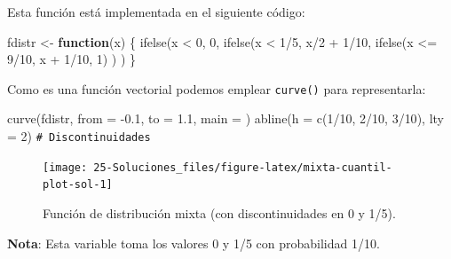 \documentclass[
  10pt,
]{book}
\newenvironment{Shaded}{\begin{snugshade}}{\end{snugshade}}
\newcommand{\AttributeTok}[1]{\textcolor[rgb]{0.77,0.63,0.00}{#1}}
\newcommand{\CommentTok}[1]{\textcolor[rgb]{0.56,0.35,0.01}{\textit{#1}}}
\newcommand{\ControlFlowTok}[1]{\textcolor[rgb]{0.13,0.29,0.53}{\textbf{#1}}}
\newcommand{\DecValTok}[1]{\textcolor[rgb]{0.00,0.00,0.81}{#1}}
\newcommand{\FloatTok}[1]{\textcolor[rgb]{0.00,0.00,0.81}{#1}}
\newcommand{\FunctionTok}[1]{\textcolor[rgb]{0.00,0.00,0.00}{#1}}
\newcommand{\NormalTok}[1]{#1}
\newcommand{\OtherTok}[1]{\textcolor[rgb]{0.56,0.35,0.01}{#1}}
\newcommand{\SpecialCharTok}[1]{\textcolor[rgb]{0.00,0.00,0.00}{#1}}
\newcommand{\StringTok}[1]{\textcolor[rgb]{0.31,0.60,0.02}{#1}}
\theoremstyle{break}
\theoremstyle{nonumberplain}
\renewcommand{\CommentTok}[1]{\textcolor[rgb]{0.41,0.41,0.41}{\texttt{#1}}}
\begin{document}
Esta función está implementada en el siguiente código:

\begin{Shaded}
\begin{Highlighting}[]
\NormalTok{fdistr }\OtherTok{\textless{}{-}} \ControlFlowTok{function}\NormalTok{(x) \{}
\FunctionTok{ifelse}\NormalTok{(x }\SpecialCharTok{\textless{}} \DecValTok{0}\NormalTok{, }\DecValTok{0}\NormalTok{,}
    \FunctionTok{ifelse}\NormalTok{(x }\SpecialCharTok{\textless{}} \DecValTok{1}\SpecialCharTok{/}\DecValTok{5}\NormalTok{, x}\SpecialCharTok{/}\DecValTok{2} \SpecialCharTok{+} \DecValTok{1}\SpecialCharTok{/}\DecValTok{10}\NormalTok{,}
        \FunctionTok{ifelse}\NormalTok{(x }\SpecialCharTok{\textless{}=} \DecValTok{9}\SpecialCharTok{/}\DecValTok{10}\NormalTok{, x }\SpecialCharTok{+} \DecValTok{1}\SpecialCharTok{/}\DecValTok{10}\NormalTok{, }\DecValTok{1}\NormalTok{) ) )}
\NormalTok{\}}
\end{Highlighting}
\end{Shaded}

Como es una función vectorial podemos emplear \texttt{curve()} para representarla:

\begin{Shaded}
\begin{Highlighting}[]
\FunctionTok{curve}\NormalTok{(fdistr, }\AttributeTok{from =} \SpecialCharTok{{-}}\FloatTok{0.1}\NormalTok{, }\AttributeTok{to =} \FloatTok{1.1}\NormalTok{, }\AttributeTok{main =} \StringTok{\textquotesingle{}\textquotesingle{}}\NormalTok{)}
\FunctionTok{abline}\NormalTok{(}\AttributeTok{h =} \FunctionTok{c}\NormalTok{(}\DecValTok{1}\SpecialCharTok{/}\DecValTok{10}\NormalTok{, }\DecValTok{2}\SpecialCharTok{/}\DecValTok{10}\NormalTok{, }\DecValTok{3}\SpecialCharTok{/}\DecValTok{10}\NormalTok{), }\AttributeTok{lty =} \DecValTok{2}\NormalTok{) }\CommentTok{\# Discontinuidades}
\end{Highlighting}
\end{Shaded}

\begin{figure}[!htbp]

{\centering \texttt{[image: 25-Soluciones\_files/figure-latex/mixta-cuantil-plot-sol-1]} 

}

\caption{Función de distribución mixta (con discontinuidades en 0 y 1/5).}\label{fig:mixta-cuantil-plot-sol}
\end{figure}

\textbf{Nota}: Esta variable toma los valores 0 y 1/5 con probabilidad 1/10.
\end{document}
